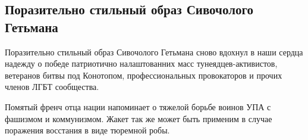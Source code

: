  


 

\subsection{Поразительно стильный образ Сивочолого Гетьмана}


Поразительно стильный образ Сивочолого Гетьмана сново вдохнул в наши сердца
надежду о победе патриотично налаштованних масс тунеядцев-активистов, ветеранов
битвы под Конотопом, профессиональных провокаторов и прочих членов ЛГБТ
сообщества. 

Помятый френч отца нации напоминает о тяжелой борьбе воинов УПА с фашизмом и
коммунизмом.  Жакет так же может быть применим в случае поражения восстания в
виде тюремной робы.

